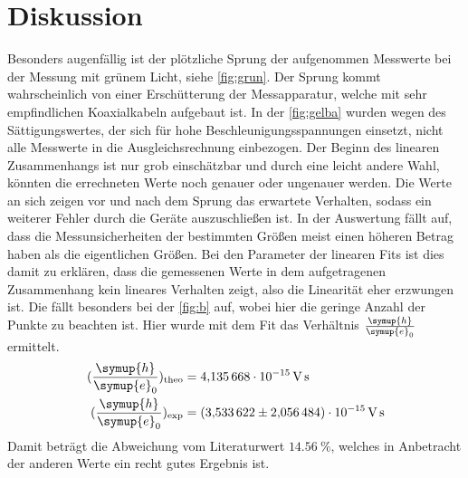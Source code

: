 \section{Diskussion}
\label{sec:Diskussion}
Besonders augenfällig ist der plötzliche Sprung der aufgenommen Messwerte bei der Messung mit grünem Licht, siehe \autoref{fig:grun}.
Der Sprung kommt wahrscheinlich von einer Erschütterung der Messapparatur, welche mit sehr empfindlichen Koaxialkabeln aufgebaut ist.
In der \autoref{fig:gelba} wurden wegen des Sättigungswertes, der sich für hohe Beschleunigungsspannungen einsetzt, nicht alle Messwerte in die Ausgleichsrechnung einbezogen.
Der Beginn des linearen Zusammenhangs ist nur grob einschätzbar und durch eine leicht andere Wahl, könnten die errechneten Werte noch genauer oder ungenauer werden.
Die Werte an sich zeigen vor und nach dem Sprung das erwartete Verhalten, sodass ein weiterer Fehler durch die Geräte auszuschließen ist.
In der Auswertung fällt auf, dass die Messunsicherheiten der bestimmten Größen meist einen höheren Betrag haben als die eigentlichen Größen. 
Bei den Parameter der linearen Fits ist dies damit zu erklären, dass die gemessenen Werte in dem aufgetragenen Zusammenhang kein lineares Verhalten zeigt, also die Linearität eher erzwungen ist.
Die fällt besonders bei der \autoref{fig:b} auf, wobei hier die geringe Anzahl der Punkte zu beachten ist. 
Hier wurde mit dem Fit das Verhältnis $\frac{\symup{h}}{\symup{e}_0}$ ermittelt. 
\begin{align*}
    (\frac{\symup{h}}{\symup{e}_0})_{\text{theo}} &= \SI{4.135668e-15}{\volt\second}\\
    (\frac{\symup{h}}{\symup{e}_0})_{\text{exp}} &= \SI{3.533622(2056484)e-15}{\volt\second}
\end{align*} 
Damit beträgt die Abweichung vom Literaturwert $\SI{14.56}{\percent}$, welches in Anbetracht der anderen Werte ein recht gutes Ergebnis ist.

\newpage
